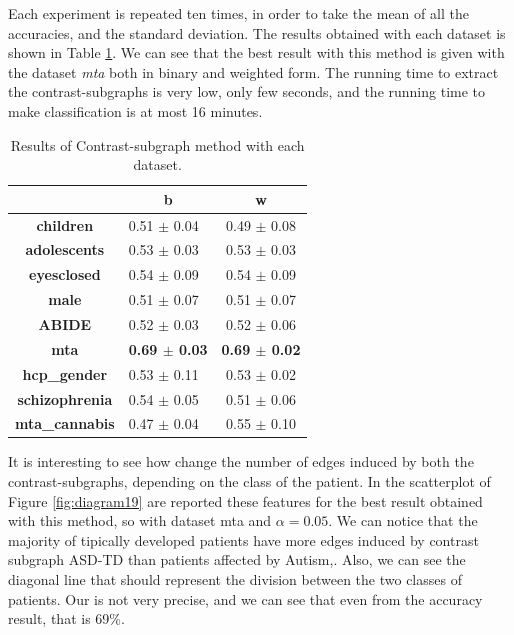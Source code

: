 Each experiment is repeated ten times, in order to take the mean of all the accuracies, and the standard deviation. The results obtained with each dataset is shown in Table \ref{tab:c-s}. We can see that the best result with this method is given with the dataset \textit{mta} both in binary and weighted form. The running time to extract the contrast-subgraphs is very low, only few seconds, and the running time to make classification is at most 16 minutes.
\vspace{0.5cm}
\begin{table}
	\centering
	\begin{tabular}{c|l|c} 
		\toprule
		& \multicolumn{1}{c|}{b} & w                \\ 
		\midrule
		\textbf{children}      & 0.51 $\pm$ 0.04        & 0.49 $\pm$ 0.08  \\
		\textbf{adolescents}   & 0.53 $\pm$ 0.03        & 0.53 $\pm$ 0.03  \\
		\textbf{eyesclosed}    & 0.54 $\pm$ 0.09        & 0.54 $\pm$ 0.09  \\
		\textbf{male}          & 0.51 $\pm$ 0.07        & 0.51 $\pm$ 0.07  \\
		\textbf{ABIDE}         & 0.52 $\pm$ 0.03        & 0.52 $\pm$ 0.06  \\
		\textbf{mta}           & \textbf{0.69 $\pm$ 0.03}        & \textbf{0.69 $\pm$ 0.02}  \\
		\textbf{hcp\_gender}   & 0.53 $\pm$ 0.11        & 0.53 $\pm$ 0.02  \\
		\textbf{schizophrenia} & 0.54 $\pm$ 0.05        & 0.51 $\pm$ 0.06  \\
		\textbf{mta\_cannabis} & 0.47 $\pm$ 0.04        & 0.55 $\pm$ 0.10 \\
		\bottomrule
	\end{tabular}
	\caption{Results of Contrast-subgraph method with each dataset.}
	\label{tab:c-s}
\end{table}

It is interesting to see how change the number of edges induced by both the contrast-subgraphs, depending on the class of the patient. In the scatterplot of Figure \ref{fig:diagram19} are reported these features for the best result obtained with this method, so with dataset mta and $ \alpha = 0.05 $. We can notice that the majority of tipically developed patients have more edges induced by contrast subgraph ASD-TD than patients affected by Autism,. Also, we can see the diagonal line that should represent the division between the two classes of patients. Our is not very precise, and we can see that even from the accuracy result, that is 69\%.

